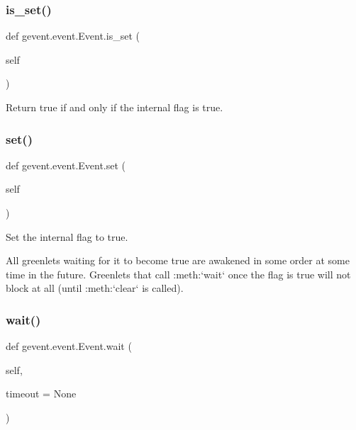 \subsubsection{\texorpdfstring{is\+\_\+set()}{is\_set()}}
{\footnotesize\ttfamily def gevent.\+event.\+Event.\+is\+\_\+set (\begin{DoxyParamCaption}\item[{}]{self }\end{DoxyParamCaption})}

\begin{DoxyVerb}Return true if and only if the internal flag is true.\end{DoxyVerb}
 \mbox{\label{classgevent_1_1event_1_1_event_aa5efca322b515fc7d3f63421c5d306f2}} 
\subsubsection{\texorpdfstring{set()}{set()}}
{\footnotesize\ttfamily def gevent.\+event.\+Event.\+set (\begin{DoxyParamCaption}\item[{}]{self }\end{DoxyParamCaption})}

\begin{DoxyVerb}Set the internal flag to true.

All greenlets waiting for it to become true are awakened in
some order at some time in the future. Greenlets that call
:meth:`wait` once the flag is true will not block at all
(until :meth:`clear` is called).
\end{DoxyVerb}
 \mbox{\label{classgevent_1_1event_1_1_event_a43ae57bb509c35b4d91491b8caea3378}} 
\subsubsection{\texorpdfstring{wait()}{wait()}}
{\footnotesize\ttfamily def gevent.\+event.\+Event.\+wait (\begin{DoxyParamCaption}\item[{}]{self,  }\item[{}]{timeout = {\ttfamily None} }\end{DoxyParamCaption})}

